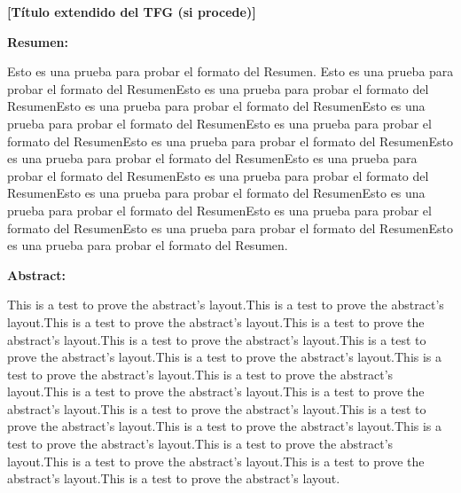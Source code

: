 
\newpage
\thispagestyle{empty} %

{\bfseries \large [Título extendido del TFG (si procede)] }\vspace{10mm} 

{\bfseries \large Resumen:} \vspace{5mm}

Esto es una prueba para probar el formato del Resumen. Esto es una prueba para probar el formato del ResumenEsto es una prueba para probar el formato del ResumenEsto es una prueba para probar el formato del ResumenEsto es una prueba para probar el formato del ResumenEsto es una prueba para probar el formato del ResumenEsto es una prueba para probar el formato del ResumenEsto es una prueba para probar el formato del ResumenEsto es una prueba para probar el formato del ResumenEsto es una prueba para probar el formato del ResumenEsto es una prueba para probar el formato del ResumenEsto es una prueba para probar el formato del ResumenEsto es una prueba para probar el formato del ResumenEsto es una prueba para probar el formato del ResumenEsto es una prueba para probar el formato del Resumen.
\vspace{1cm}

{\bfseries \large Abstract: }\vspace{5mm} 

This is a test to prove the abstract's layout.This is a test to prove the abstract's layout.This is a test to prove the abstract's layout.This is a test to prove the abstract's layout.This is a test to prove the abstract's layout.This is a test to prove the abstract's layout.This is a test to prove the abstract's layout.This is a test to prove the abstract's layout.This is a test to prove the abstract's layout.This is a test to prove the abstract's layout.This is a test to prove the abstract's layout.This is a test to prove the abstract's layout.This is a test to prove the abstract's layout.This is a test to prove the abstract's layout.This is a test to prove the abstract's layout.This is a test to prove the abstract's layout.This is a test to prove the abstract's layout.This is a test to prove the abstract's layout.This is a test to prove the abstract's layout.
\vspace{1cm}

